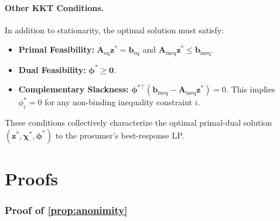 \documentclass[12pt, notitlepage]{article}
\begin{document}
\paragraph{Other KKT Conditions.}
In addition to stationarity, the optimal solution must satisfy:
\begin{itemize}[noitemsep]
    \item \textbf{Primal Feasibility:} $\mathbf{A}_{\text{eq}} \mathbf{z}^* = \mathbf{b}_{\text{eq}}$ and $\mathbf{A}_{\text{ineq}} \mathbf{z}^* \le \mathbf{b}_{\text{ineq}}$.
    \item \textbf{Dual Feasibility:} $\boldsymbol{\phi}^* \ge \mathbf{0}$.
    \item \textbf{Complementary Slackness:} $\boldsymbol{\phi}^{*\top} (\mathbf{b}_{\text{ineq}} - \mathbf{A}_{\text{ineq}} \mathbf{z}^*) = 0$. This implies $\phi_i^* = 0$ for any non-binding inequality constraint $i$.
\end{itemize}
These conditions collectively characterize the optimal primal-dual solution $(\mathbf{z}^*, \boldsymbol{\chi}^*, \boldsymbol{\phi}^*)$ to the prosumer's best-response LP.

\section{Proofs}

\subsubsection*{Proof of \cref{prop:anonimity}}
\end{document}
